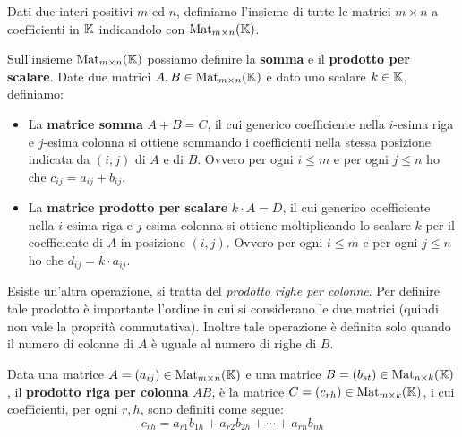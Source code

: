 \begin{definition}
	Dati due interi positivi $m$ ed $n$, definiamo l'insieme di tutte le matrici $m \times n$ a
	coefficienti in $\mathbb{K}$ indicandolo con $\operatorname{Mat}_{m \times n} (\mathbb{K})$.
\end{definition}

\begin{definition}
	Sull'insieme $\operatorname{Mat}_{m \times n} (\mathbb{K})$ possiamo definire la \textbf{somma} e il
	\textbf{prodotto per scalare}. Date due matrici $A, B \in \operatorname{Mat}_{m \times n} (\mathbb{K})$ e dato uno scalare
	$k \in \mathbb{K}$, definiamo:
	\begin{itemize}
		\item La \textbf{matrice somma} $A + B = C$, il cui generico coefficiente nella $i$-esima riga e
		      $j$-esima colonna si ottiene sommando i coefficienti nella stessa posizione indicata da $(i, j)$
		      di $A$ e di $B$. Ovvero per ogni $i \leq m$ e per ogni $j \leq n$ ho che $c_{ij} = a_{ij} + b_{ij}$.
		\item La \textbf{matrice prodotto per scalare} $k \cdot A = D$, il cui generico coefficiente nella
		      $i$-esima riga e $j$-esima colonna si ottiene moltiplicando lo scalare $k$ per il coefficiente
		      di $A$ in posizione $(i, j)$. Ovvero per ogni $i \leq m$ e per ogni $j \leq n$ ho che
		      $d_{ij} = k \cdot a_{ij}$.
	\end{itemize}
\end{definition}

Esiste un'altra operazione, si tratta del \emph{prodotto righe per colonne}. Per definire tale prodotto è
importante l'ordine in cui si considerano le due matrici (quindi non vale la proprità commutativa). Inoltre
tale operazione è definita solo quando il numero di colonne di $A$ è uguale al numero di righe di $B$.

\begin{definition}
	Data una matrice $A = (a_{ij}) \in \operatorname{Mat}_{m \times n} (\mathbb{K})$ e una matrice
	$B = (b_{st}) \in \operatorname{Mat}_{n \times k} (\mathbb{K})$, il \textbf{prodotto riga per colonna} $AB$, è la matrice
	$C = (c_{rh}) \in \operatorname{Mat}_{m \times k} (\mathbb{K})$, i cui coefficienti, per ogni $r, h$, sono definiti come
	segue:
	\[ c_{rh} = a_{r1} b_{1h} + a_{r2} b_{2h} + \cdots + a_{rn} b_{nh} \]
\end{definition}

